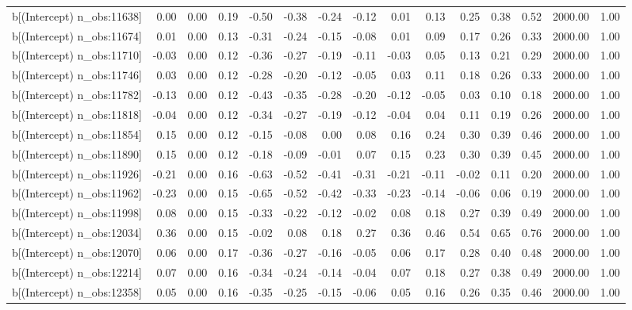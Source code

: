 \begin{table}[ht]
\begin{tabular}{rrrrrrrrrrrrrrr}
  b[(Intercept) n\_obs:11638] & 0.00 & 0.00 & 0.19 & -0.50 & -0.38 & -0.24 & -0.12 & 0.01 & 0.13 & 0.25 & 0.38 & 0.52 & 2000.00 & 1.00 \\ 
  b[(Intercept) n\_obs:11674] & 0.01 & 0.00 & 0.13 & -0.31 & -0.24 & -0.15 & -0.08 & 0.01 & 0.09 & 0.17 & 0.26 & 0.33 & 2000.00 & 1.00 \\ 
  b[(Intercept) n\_obs:11710] & -0.03 & 0.00 & 0.12 & -0.36 & -0.27 & -0.19 & -0.11 & -0.03 & 0.05 & 0.13 & 0.21 & 0.29 & 2000.00 & 1.00 \\ 
  b[(Intercept) n\_obs:11746] & 0.03 & 0.00 & 0.12 & -0.28 & -0.20 & -0.12 & -0.05 & 0.03 & 0.11 & 0.18 & 0.26 & 0.33 & 2000.00 & 1.00 \\ 
  b[(Intercept) n\_obs:11782] & -0.13 & 0.00 & 0.12 & -0.43 & -0.35 & -0.28 & -0.20 & -0.12 & -0.05 & 0.03 & 0.10 & 0.18 & 2000.00 & 1.00 \\ 
  b[(Intercept) n\_obs:11818] & -0.04 & 0.00 & 0.12 & -0.34 & -0.27 & -0.19 & -0.12 & -0.04 & 0.04 & 0.11 & 0.19 & 0.26 & 2000.00 & 1.00 \\ 
  b[(Intercept) n\_obs:11854] & 0.15 & 0.00 & 0.12 & -0.15 & -0.08 & 0.00 & 0.08 & 0.16 & 0.24 & 0.30 & 0.39 & 0.46 & 2000.00 & 1.00 \\ 
  b[(Intercept) n\_obs:11890] & 0.15 & 0.00 & 0.12 & -0.18 & -0.09 & -0.01 & 0.07 & 0.15 & 0.23 & 0.30 & 0.39 & 0.45 & 2000.00 & 1.00 \\ 
  b[(Intercept) n\_obs:11926] & -0.21 & 0.00 & 0.16 & -0.63 & -0.52 & -0.41 & -0.31 & -0.21 & -0.11 & -0.02 & 0.11 & 0.20 & 2000.00 & 1.00 \\ 
  b[(Intercept) n\_obs:11962] & -0.23 & 0.00 & 0.15 & -0.65 & -0.52 & -0.42 & -0.33 & -0.23 & -0.14 & -0.06 & 0.06 & 0.19 & 2000.00 & 1.00 \\ 
  b[(Intercept) n\_obs:11998] & 0.08 & 0.00 & 0.15 & -0.33 & -0.22 & -0.12 & -0.02 & 0.08 & 0.18 & 0.27 & 0.39 & 0.49 & 2000.00 & 1.00 \\ 
  b[(Intercept) n\_obs:12034] & 0.36 & 0.00 & 0.15 & -0.02 & 0.08 & 0.18 & 0.27 & 0.36 & 0.46 & 0.54 & 0.65 & 0.76 & 2000.00 & 1.00 \\ 
  b[(Intercept) n\_obs:12070] & 0.06 & 0.00 & 0.17 & -0.36 & -0.27 & -0.16 & -0.05 & 0.06 & 0.17 & 0.28 & 0.40 & 0.48 & 2000.00 & 1.00 \\ 
  b[(Intercept) n\_obs:12214] & 0.07 & 0.00 & 0.16 & -0.34 & -0.24 & -0.14 & -0.04 & 0.07 & 0.18 & 0.27 & 0.38 & 0.49 & 2000.00 & 1.00 \\ 
  b[(Intercept) n\_obs:12358] & 0.05 & 0.00 & 0.16 & -0.35 & -0.25 & -0.15 & -0.06 & 0.05 & 0.16 & 0.26 & 0.35 & 0.46 & 2000.00 & 1.00 \\ 

\end{tabular}
\end{table}
